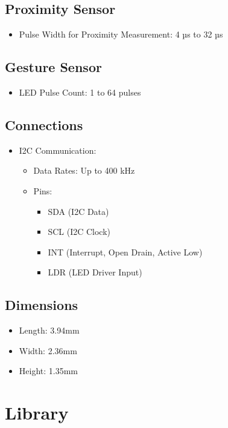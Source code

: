 \subsection*{Proximity Sensor}
\begin{itemize}
	\item Pulse Width for Proximity Measurement: 4 µs to 32 µs
\end{itemize}

\subsection*{Gesture Sensor}
\begin{itemize}
	\item LED Pulse Count: 1 to 64 pulses
\end{itemize}

\subsection*{Connections}
\begin{itemize}
	\item I2C Communication:
	\begin{itemize}
		\item Data Rates: Up to 400 kHz
		\item Pins:
		\begin{itemize}
			\item SDA (I2C Data)
			\item SCL (I2C Clock)
			\item INT (Interrupt, Open Drain, Active Low)
			\item LDR (LED Driver Input)
		\end{itemize}
	\end{itemize}
\end{itemize}

\subsection*{Dimensions}
\begin{itemize}
	\item Length: 3.94mm
	\item Width: 2.36mm
	\item Height: 1.35mm
\end{itemize}

\cite{Avago:2015}


\section{Library}

